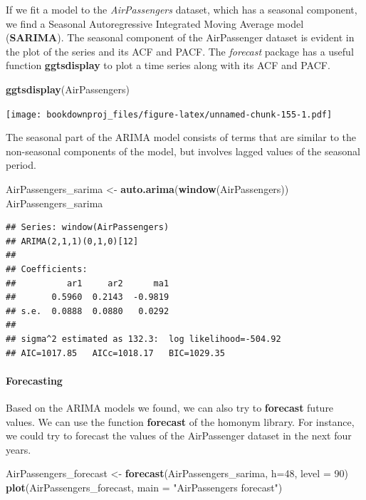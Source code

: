 \documentclass[
]{article}
\newenvironment{Shaded}{\begin{snugshade}}{\end{snugshade}}
\newcommand{\DataTypeTok}[1]{\textcolor[rgb]{0.13,0.29,0.53}{#1}}
\newcommand{\DecValTok}[1]{\textcolor[rgb]{0.00,0.00,0.81}{#1}}
\newcommand{\KeywordTok}[1]{\textcolor[rgb]{0.13,0.29,0.53}{\textbf{#1}}}
\newcommand{\NormalTok}[1]{#1}
\newcommand{\StringTok}[1]{\textcolor[rgb]{0.31,0.60,0.02}{#1}}
\begin{document}
If we fit a model to the \emph{AirPassengers} dataset, which has a seasonal component, we find a Seasonal Autoregressive Integrated Moving Average model (\textbf{SARIMA}). The seasonal component of the AirPassenger dataset is evident in the plot of the series and its ACF and PACF. The \emph{forecast} package has a useful function \textbf{ggtsdisplay} to plot a time series along with its ACF and PACF.

\begin{Shaded}
\begin{Highlighting}[]
\KeywordTok{ggtsdisplay}\NormalTok{(AirPassengers)}
\end{Highlighting}
\end{Shaded}

\texttt{[image: bookdownproj\_files/figure-latex/unnamed-chunk-155-1.pdf]}

The seasonal part of the ARIMA model consists of terms that are similar to the non-seasonal components of the model, but involves lagged values of the seasonal period.

\begin{Shaded}
\begin{Highlighting}[]
\NormalTok{AirPassengers_sarima <-}\StringTok{ }\KeywordTok{auto.arima}\NormalTok{(}\KeywordTok{window}\NormalTok{(AirPassengers))}
\NormalTok{AirPassengers_sarima}
\end{Highlighting}
\end{Shaded}

\begin{verbatim}
## Series: window(AirPassengers) 
## ARIMA(2,1,1)(0,1,0)[12] 
## 
## Coefficients:
##          ar1     ar2      ma1
##       0.5960  0.2143  -0.9819
## s.e.  0.0888  0.0880   0.0292
## 
## sigma^2 estimated as 132.3:  log likelihood=-504.92
## AIC=1017.85   AICc=1018.17   BIC=1029.35
\end{verbatim}

\hypertarget{forecasting}{%
\paragraph{Forecasting}\label{forecasting}}

Based on the ARIMA models we found, we can also try to \textbf{forecast} future values. We can use the function \textbf{forecast} of the homonym library. For instance, we could try to forecast the values of the AirPassenger dataset in the next four years.

\begin{Shaded}
\begin{Highlighting}[]
\NormalTok{AirPassengers_forecast <-}\StringTok{ }\KeywordTok{forecast}\NormalTok{(AirPassengers_sarima, }\DataTypeTok{h=}\DecValTok{48}\NormalTok{, }\DataTypeTok{level =} \DecValTok{90}\NormalTok{)}
\KeywordTok{plot}\NormalTok{(AirPassengers_forecast, }\DataTypeTok{main =} \StringTok{"AirPassengers forecast"}\NormalTok{)}
\end{Highlighting}
\end{Shaded}
\end{document}
